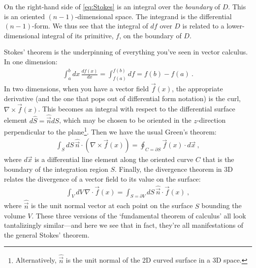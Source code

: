 On the right-hand side of \eqref{eq:Stokes} is an integral over the \emph{boundary} of $D$. This is an oriented $(n-1)$-dimensional space. The integrand is the differential $(n-1)$-form. We thus see that the integral of $df$ over $D$ is related to a lower-dimensional integral of its primitive, $f$, on the boundary of $D$. 

Stokes' theorem is the underpinning of everything you've seen in vector calculus. In one dimension:
\begin{align}
	\int_a^b dx\, \frac{df(x)}{dx} = \int_{f(a)}^{f(b)} df = f(b)-f(a) \ .
\end{align}
In two dimensions, when you have a vector field $\vec{f}(x)$, the appropriate derivative (and the one that pops out of differential form notation) is the curl, $\nabla\times \vec{f}(x)$. This becomes an integral with respect to the differential surface element $d\hat{S} = \hat{\vec{n}} dS$, which may be chosen to be oriented in the $z$-direction perpendicular to the plane\footnote{Alternatively, $\hat{\vec{n}}$ is the unit normal of the 2D curved surface in a 3D space.}. Then we have the usual  Green's theorem:
\begin{align}
	\int_S dS\, \hat{\vec{n}}\cdot \left(\nabla\times \vec{f}(x)\right) 
	=
	\oint_{C=\partial S} \vec{f}(x)\cdot d\vec{x} 
	\ ,
\end{align}
where $d\vec{x}$ is a differential line element along the oriented curve $C$ that is the boundary of the integration region $S$. Finally, the divergence theorem in 3D relates the divergence of a vector field to its value on the surface:
\begin{align}
	\int_V dV \, \nabla\cdot \vec{f}(x)
	=
	\int_{S=\partial V} dS \, \hat{\vec{n}} \cdot \vec{f}(x) \ ,
\end{align}
where $\hat{\vec{n}}$ is the unit normal vector at each point on the surface $S$ bounding the volume $V$. These three versions of the `fundamental theorem of calculus' all look tantalizingly similar---and here we see that in fact, they're all manifestations of the general Stokes' theorem. 

